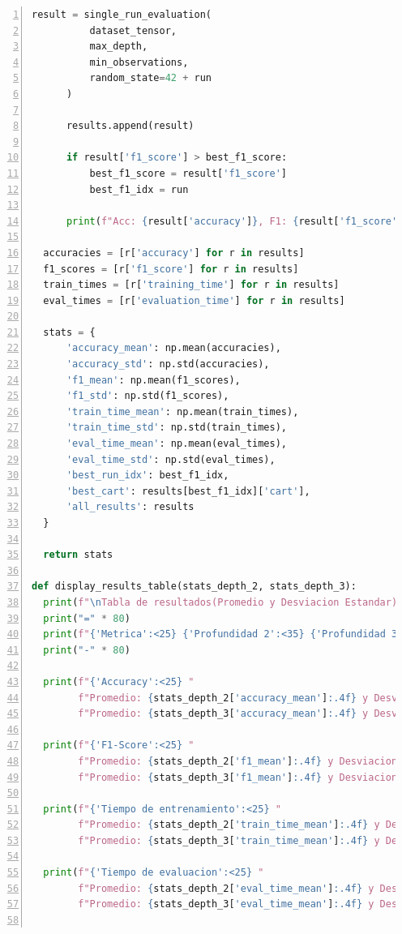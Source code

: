 \documentclass[12pt,a4paper]{article}
\begin{document}
\begin{lstlisting}[language=Python, numbers=left, basicstyle=\ttfamily\tiny,label={lst:lstlisting10}]
      result = single_run_evaluation(
          dataset_tensor,
          max_depth,
          min_observations,
          random_state=42 + run
      )

      results.append(result)

      if result['f1_score'] > best_f1_score:
          best_f1_score = result['f1_score']
          best_f1_idx = run

      print(f"Acc: {result['accuracy']}, F1: {result['f1_score']}")

  accuracies = [r['accuracy'] for r in results]
  f1_scores = [r['f1_score'] for r in results]
  train_times = [r['training_time'] for r in results]
  eval_times = [r['evaluation_time'] for r in results]

  stats = {
      'accuracy_mean': np.mean(accuracies),
      'accuracy_std': np.std(accuracies),
      'f1_mean': np.mean(f1_scores),
      'f1_std': np.std(f1_scores),
      'train_time_mean': np.mean(train_times),
      'train_time_std': np.std(train_times),
      'eval_time_mean': np.mean(eval_times),
      'eval_time_std': np.std(eval_times),
      'best_run_idx': best_f1_idx,
      'best_cart': results[best_f1_idx]['cart'],
      'all_results': results
  }

  return stats

def display_results_table(stats_depth_2, stats_depth_3):
  print(f"\nTabla de resultados(Promedio y Desviacion Estandar)")
  print("=" * 80)
  print(f"{'Metrica':<25} {'Profundidad 2':<35} {'Profundidad 3'}")
  print("-" * 80)

  print(f"{'Accuracy':<25} "
        f"Promedio: {stats_depth_2['accuracy_mean']:.4f} y Desviacion: {stats_depth_2['accuracy_std']:.4f} "
        f"Promedio: {stats_depth_3['accuracy_mean']:.4f} y Desviacion: {stats_depth_3['accuracy_std']:.4f}")

  print(f"{'F1-Score':<25} "
        f"Promedio: {stats_depth_2['f1_mean']:.4f} y Desviacion: {stats_depth_2['f1_std']:.4f} "
        f"Promedio: {stats_depth_3['f1_mean']:.4f} y Desviacion: {stats_depth_3['f1_std']:.4f}")

  print(f"{'Tiempo de entrenamiento':<25} "
        f"Promedio: {stats_depth_2['train_time_mean']:.4f} y Desviacion: {stats_depth_2['train_time_std']:.4f} "
        f"Promedio: {stats_depth_3['train_time_mean']:.4f} y Desviacion: {stats_depth_3['train_time_std']:.4f}")

  print(f"{'Tiempo de evaluacion':<25} "
        f"Promedio: {stats_depth_2['eval_time_mean']:.4f} y Desviacion: {stats_depth_2['eval_time_std']:.4f} "
        f"Promedio: {stats_depth_3['eval_time_mean']:.4f} y Desviacion: {stats_depth_3['eval_time_std']:.4f}")


\end{lstlisting}
\end{document}
